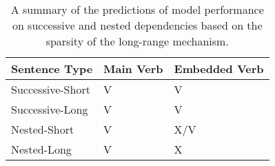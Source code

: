 \begin{center}
\begin{table}
\centering
\begin{tabular}{|P{3.5cm}||P{3.5cm}|P{3.5cm}|}
    \hline
    \B Sentence Type & \B Main Verb & \B Embedded Verb \\
    \hline
    Successive-Short & V  & V \\
    \hline
    Successive-Long & V & V \\
    \hline
    Nested-Short & V & X/V \\
    \hline
    Nested-Long & V & X \\
    \hline
\end{tabular}
\caption{A summary of the predictions of model performance on successive and nested dependencies based on the sparsity of the long-range mechanism.}
\label{tbl:predictions}
\end{table}
\end{center}